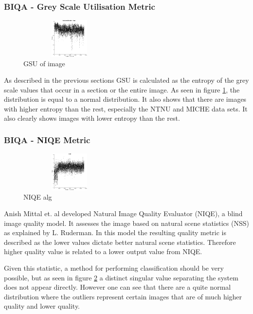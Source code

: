 \subsubsection{BIQA - Grey Scale Utilisation Metric}\vspace{-5mm}
	\begin{figure}
		\centering
		\includegraphics[height=2cm, width=5cm]{pics/biqa_dist_gsu_full}
		\caption{GSU of image \cite{iso}}
		\label{fig:gsuf}
	\end{figure}
As described in the previous sections GSU is calculated as the entropy of the
grey scale values that occur in a section or the entire image.  As seen in figure
\ref{fig:gsuf}, the distribution is equal to a normal distribution.  It also
shows that there are images with higher entropy than the rest, especially the
NTNU and MICHE data sets.  It also clearly shows images with lower entropy than
the rest.


\vspace{-5mm}
\subsubsection{BIQA - NIQE Metric}\vspace{-5mm}
	\begin{figure}
		\centering
		\includegraphics[height=2cm, width=5cm]{pics/biqa_dist_niqe}
		\caption{NIQE alg \cite{niqe}}
		\label{fig:niqe}
	\end{figure}
Anish Mittal et. al developed Natural Image Quality Evaluator (NIQE), a blind 
image quality model\cite{niqe}.  It assesses the image based on natural scene
statistics (NSS) as explained by L. Ruderman\cite{nss}.
In this model the resulting quality metric is described as the lower values
dictate better natural scene statistics. Therefore higher quality value is
related to a lower output value from NIQE.

Given this statistic, a method for performing classification should be very
possible, but as seen in figure \ref{fig:niqe} a distinct singular value
separating the system does not appear directly.  However one can see that there
are a quite normal distribution where the outliers represent certain images that
are of much higher quality and lower quality.


